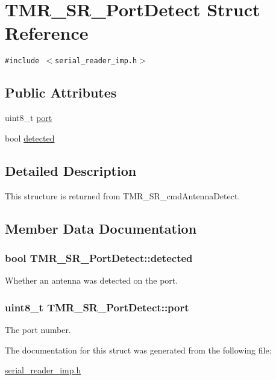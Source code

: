 \hypertarget{struct_t_m_r___s_r___port_detect}{
\section{TMR\_\-SR\_\-PortDetect Struct Reference}
\label{struct_t_m_r___s_r___port_detect}
}
{\tt \#include $<$serial\_\-reader\_\-imp.h$>$}

\subsection*{Public Attributes}
\begin{CompactItemize}
\item 
uint8\_\-t \hyperlink{struct_t_m_r___s_r___port_detect_fb10e2b509f0fd17dc97f7578144d935}{port}
\item 
bool \hyperlink{struct_t_m_r___s_r___port_detect_dbe4e130cc3539d7149fcb7ab874efc5}{detected}
\end{CompactItemize}


\subsection{Detailed Description}
This structure is returned from TMR\_\-SR\_\-cmdAntennaDetect. 

\subsection{Member Data Documentation}
\hypertarget{struct_t_m_r___s_r___port_detect_dbe4e130cc3539d7149fcb7ab874efc5}{
\subsubsection[{detected}]{\setlength{\rightskip}{0pt plus 5cm}bool {\bf TMR\_\-SR\_\-PortDetect::detected}}}
\label{struct_t_m_r___s_r___port_detect_dbe4e130cc3539d7149fcb7ab874efc5}


Whether an antenna was detected on the port. \hypertarget{struct_t_m_r___s_r___port_detect_fb10e2b509f0fd17dc97f7578144d935}{
\subsubsection[{port}]{\setlength{\rightskip}{0pt plus 5cm}uint8\_\-t {\bf TMR\_\-SR\_\-PortDetect::port}}}
\label{struct_t_m_r___s_r___port_detect_fb10e2b509f0fd17dc97f7578144d935}


The port number. 

The documentation for this struct was generated from the following file:\begin{CompactItemize}
\item 
\hyperlink{serial__reader__imp_8h}{serial\_\-reader\_\-imp.h}\end{CompactItemize}

